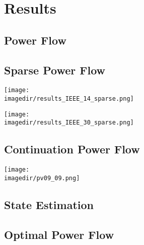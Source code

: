 \documentclass[varwidth]{standalone}
\providecommand{\powerflow}[1]{Power Flow}
\providecommand{\sparse}[1]{Sparse Power Flow}
\providecommand{\cpf}[1]{Continuation Power Flow}
\providecommand{\se}[1]{State Estimation}
\providecommand{\opf}[1]{Optimal Power Flow}
\providecommand{\imagedir}{../../images}
\begin{document}
\section{Results}

\subsection{\powerflow{}}

\subsection{\sparse{}}
\texttt{[image: \\imagedir/results\_IEEE\_14\_sparse.png]}

\texttt{[image: \\imagedir/results\_IEEE\_30\_sparse.png]}

\subsection{\cpf{}}

\texttt{[image: \\imagedir/pv09\_09.png]}

\subsection{\se{}}

\subsection{\opf{}}
\end{document}
